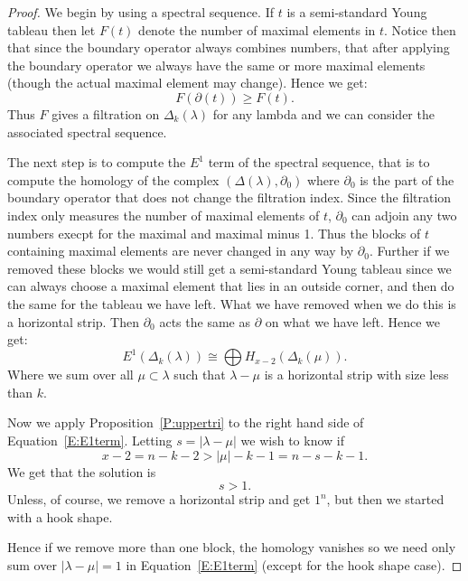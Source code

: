 \documentclass{amsart}
\begin{document}
\begin{proof}
  We begin by using a spectral sequence. If $t$ is a semi-standard Young tableau then let $F(t)$ denote the number of 
  maximal elements in $t$. Notice then that since the boundary operator always combines numbers, that after applying
  the boundary operator we always have the same or more maximal elements (though the actual maximal element may change).
  Hence we get:  $$F(\partial(t)) \ge F(t).$$  Thus $F$ gives a filtration on $\Delta_k(\lambda)$ for any lambda and we
  can consider the associated spectral sequence. 

  The next step is to compute the $E^1$ term of the spectral sequence, that is to compute the homology of the complex
  $(\Delta(\lambda), \partial_0)$ where $\partial_0$ is the part of the boundary operator that does not change the 
  filtration index. Since the filtration index only measures the number of maximal elements of $t$, $\partial_0$ can adjoin
  any two numbers execpt for the maximal and maximal minus 1. Thus the blocks of $t$ containing maximal elements are never
  changed in any way by $\partial_0$. Further if we removed these blocks we would still get a semi-standard Young tableau
  since we can always choose a maximal element that lies in an outside corner, and then do the same for the tableau we 
  have left. What we have removed when we do this is a horizontal strip. Then $\partial_0$ acts the same as $\partial$ on 
  what we have left. Hence we get:
  \begin{equation}\label{E:E1term}
    E^1(\Delta_k(\lambda)) \cong \bigoplus H_{x-2}(\Delta_k(\mu)).
  \end{equation}
  Where we sum over all $\mu \subset \lambda$ such that $\lambda - \mu$ is a horizontal strip with size less than $k$.

  Now we apply Proposition~\ref{P:uppertri} to the right hand side of Equation~\ref{E:E1term}. Letting $s=|\lambda - \mu|$
  we wish to know if 
  $$ x-2=n-k-2 >|\mu| -k -1=n-s-k-1.$$ We get that the solution is $$s > 1.$$ Unless, of course, we remove a horizontal 
  strip and get $1^n$, but then we started with a hook shape.

  Hence if we remove more than one block, the
  homology vanishes so we need only sum over $|\lambda - \mu| = 1$ in Equation~\ref{E:E1term} (except for the hook  
  shape case). 


\end{proof}
\end{document}
